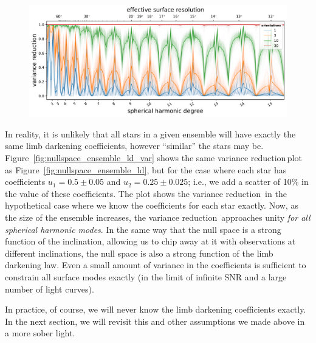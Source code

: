 \documentclass[modern,linenumbers]{aastex62}
\newcommand{\shrinkage}{{variance reduction\,}}
\begin{document}
\begin{figure}[t!]
    \begin{centering}
        \includegraphics[width=\linewidth]{figures/nullspace_ensemble_ld_var.pdf}
    \end{centering}
\end{figure}

In reality, it is unlikely that all stars in a given ensemble will have exactly
the same limb darkening coefficients, however ``similar'' the stars may be.
Figure~\ref{fig:nullspace_ensemble_ld_var} shows the same
\shrinkage plot as Figure~\ref{fig:nullspace_ensemble_ld},
but for the case where each star has coefficients
$u_1 = 0.5 \pm 0.05$ and $u_2 = 0.25 \pm 0.025$; i.e., we add a scatter of
10\% in the value of these coefficients. The plot shows the \shrinkage
in the hypothetical case where we know the coefficients for
each star exactly. Now, as the size of the ensemble increases, the \shrinkage
approaches unity \emph{for all spherical harmonic modes}.
In the same way that the null space is a strong function of the inclination,
allowing us to chip away at it with observations at different inclinations,
the null space is also a strong function of the limb darkening law. Even a
small amount of variance in the coefficients is sufficient to constrain all surface
modes exactly (in the limit of infinite SNR and a large number of light curves).

In practice, of course, we will never know the limb darkening coefficients
exactly. In the next section, we will revisit this and other assumptions we
made above in a more sober light.
\end{document}
